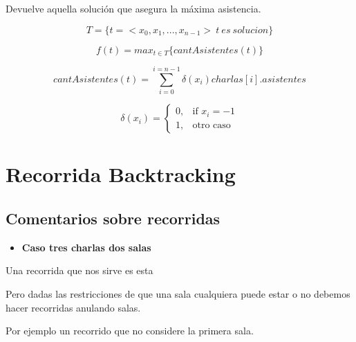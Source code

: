 \documentclass[11pt]{article}
\begin{document}
Devuelve aquella solución que asegura la máxima asistencia.


\[ T = \{ t=<x_0, x_1, ..., x_{n-1}> \  t \  es \  solucion\}\]

\[ f(t)=max_{t \in T} \{ cantAsistentes(t) \}\]

\[ cantAsistentes(t) = \sum\limits_{i=0}^{i=n-1} \delta(x_i) charlas[i].asistentes \]

\[ \delta(x_i) = 
\begin{cases}
    0,& \text{if } x_i = -1 \\
    1,              & \text{otro caso}
\end{cases}
\]


\section{Recorrida Backtracking}
\subsection{Comentarios sobre recorridas}
\begin{itemize}
\item  \textbf{Caso tres charlas dos salas}
\end{itemize}

Una recorrida que nos sirve es esta

\begin{center}
\end{center}

Pero dadas las restricciones de que una sala cualquiera puede estar o no  debemos hacer recorridas anulando salas.

Por ejemplo un recorrido que no considere la primera sala.

\begin{center}
\end{center}
\end{document}
